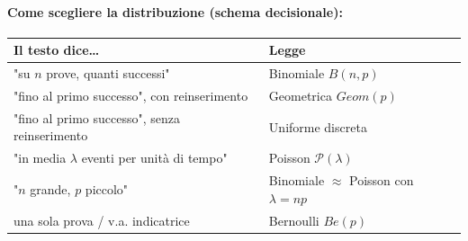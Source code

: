 \documentclass[12pt]{extarticle} %
\begin{document}
\paragraph{Come scegliere la distribuzione (schema decisionale):}
\begin{center}
\begin{tabular}{|l|l|}
\hline
\textbf{Il testo dice\dots} & \textbf{Legge} \\ \hline
"su $n$ prove, quanti successi" & Binomiale $B(n,p)$ \\ \hline
"fino al primo successo", con reinserimento & Geometrica $Geom(p)$ \\ \hline
"fino al primo successo", senza reinserimento & Uniforme discreta \\ \hline
"in media $\lambda$ eventi per unità di tempo" & Poisson $\mathcal{P}(\lambda)$ \\ \hline
"$n$ grande, $p$ piccolo" & Binomiale $\approx$ Poisson con $\lambda = np$ \\ \hline
una sola prova / v.a. indicatrice & Bernoulli $Be(p)$ \\ \hline
\end{tabular}
\end{center}
\end{document}
